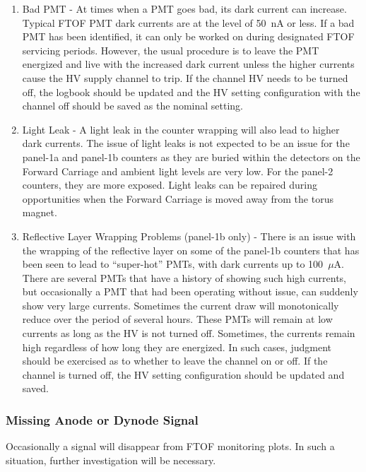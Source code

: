 \documentclass[letterpaper,10pt]{article}
\begin{document}
\begin{enumerate}
\item Bad PMT - At times when a PMT goes bad, its dark current can increase. Typical FTOF PMT dark 
currents are at the level of 50~nA or less. If a bad PMT has been identified, it can only be worked 
on during designated FTOF servicing periods. However, the usual procedure is to leave the PMT 
energized and live with the increased dark current unless the higher currents cause the HV supply 
channel to trip. If the channel HV needs to be turned off, the logbook should be updated and the HV 
setting configuration with the channel off should be saved as the nominal setting.
\item Light Leak - A light leak in the counter wrapping will also lead to higher dark currents. The 
issue of light leaks is not expected to be an issue for the panel-1a and panel-1b counters as they 
are buried within the detectors on the Forward Carriage and ambient light levels are very low. For 
the panel-2 counters, they are more exposed. Light leaks can be repaired during opportunities when 
the Forward Carriage is moved away from the torus magnet.
\item Reflective Layer Wrapping Problems (panel-1b only) - There is an issue with the wrapping of 
the reflective layer on some of the panel-1b counters that has been seen to lead to ``super-hot'' PMTs, 
with dark currents up to 100~$\mu$A. There are several PMTs that have a history of showing such high 
currents, but occasionally a PMT that had been operating without issue, can suddenly show very large 
currents. Sometimes the current draw will monotonically reduce over the period of several hours. These 
PMTs will remain at low currents as long as the HV is not turned off. Sometimes, the currents remain 
high regardless of how long they are energized. In such cases, judgment should be exercised as to 
whether to leave the channel on or off. If the channel is turned off, the HV setting configuration 
should be updated and saved.
\end{enumerate}

\subsubsection{Missing Anode or Dynode Signal}
\label{missing}

Occasionally a signal will disappear from FTOF monitoring plots. In such a situation, further
investigation will be necessary. 
\end{document}
